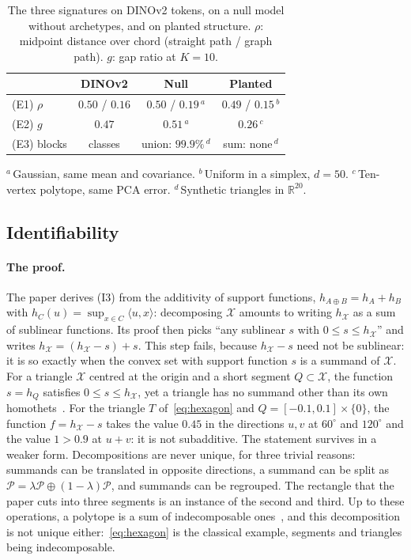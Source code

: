 \documentclass[sigconf,nonacm,screen]{acmart}
\newcommand{\R}{\mathbb{R}}
\newcommand{\msum}{\oplus}
\newcommand{\X}{\mathcal{X}}
\newcommand{\cP}{\mathcal{P}}
\begin{document}
\begin{table}
  \caption{The three signatures on DINOv2 tokens, on a null model without archetypes, and on planted
  structure. $\rho$: midpoint distance over chord (straight path / graph path). $g$: gap ratio at $K=10$.}
  \label{tab:signatures}
  \small
  \begin{tabular}{@{}lccc@{}}
    \toprule
    & DINOv2 & Null & Planted \\
    \midrule
    (E1) $\rho$ & $0.50$ / $0.16$ & $0.50$ / $0.19$\,$^{a}$ & $0.49$ / $0.15$\,$^{b}$ \\
    (E2) $g$ & $0.47$ & $0.51$\,$^{a}$ & $0.26$\,$^{c}$ \\
    (E3) blocks & classes & union: $99.9\%$\,$^{d}$ & sum: none\,$^{d}$ \\
    \bottomrule
  \end{tabular}

  \smallskip
  {\footnotesize $^{a}$\,Gaussian, same mean and covariance. $^{b}$\,Uniform in a simplex, $d=50$.
  $^{c}$\,Ten-vertex polytope, same PCA error. $^{d}$\,Synthetic triangles in $\R^{20}$.}
\end{table}

\subsection{Identifiability}
\label{sec:identifiability}

\paragraph{The proof.} The paper derives (I3) from the additivity of support functions,
$h_{A\msum B}=h_A+h_B$ with $h_C(u)=\sup_{x\in C}\langle u,x\rangle$: decomposing $\X$ amounts to writing
$h_\X$ as a sum of sublinear functions. Its proof then picks ``any sublinear $s$ with $0\le s\le h_\X$''
and writes $h_\X=(h_\X-s)+s$. This step fails, because $h_\X-s$ need not be sublinear: it is so exactly
when the convex set with support function $s$ is a summand of $\X$. For a triangle $\X$ centred at the
origin and a short segment $Q\subset\X$, the function $s=h_Q$ satisfies $0\le s\le h_\X$, yet a triangle
has no summand other than its own homothets~\cite{schneider2014convex}. For the triangle $T$ of~\eqref{eq:hexagon} and $Q=[-0.1,0.1]\times\{0\}$, the function $f=h_\X-s$ takes the value $0.45$ in
the directions $u,v$ at $60^\circ$ and $120^\circ$ and the value $1>0.9$ at $u+v$: it is not subadditive. The statement survives in a weaker form. Decompositions are never unique, for three
trivial reasons: summands can be translated in opposite directions, a summand can be split as
$\cP=\lambda\cP\msum(1-\lambda)\cP$, and summands can be regrouped. The rectangle that the paper cuts into
three segments is an instance of the second and third. Up to these operations, a polytope is a sum of
indecomposable ones~\cite{smilansky1987decomposability,schneider2014convex}, and this decomposition is not
unique either:~\eqref{eq:hexagon} is the classical example, segments and triangles being indecomposable.
\end{document}
